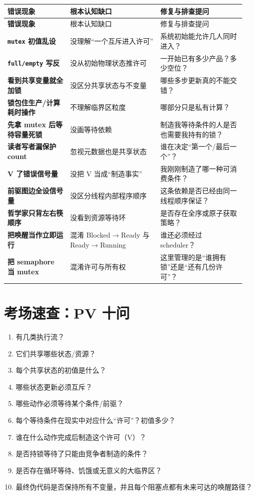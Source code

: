 \documentclass[11pt,a4paper]{ctexart}
\newcommand{\code}[1]{\texttt{#1}}
\begin{document}
\begingroup
\small
\renewcommand{\arraystretch}{1.25}
\begin{longtable}{>{\bfseries}p{0.25\linewidth} p{0.36\linewidth} p{0.34\linewidth}}
\toprule
错误现象 & 根本认知缺口 & 修复与排查提问\\
\midrule
\endfirsthead
\toprule
错误现象 & 根本认知缺口 & 修复与排查提问\\
\midrule
\endhead
\code{mutex} 初值乱设 & 没理解“一个互斥进入许可” & 系统初始能允许几人同时进入？\\
\code{full/empty} 写反 & 没从初始物理状态推许可 & 一开始已有多少产品？多少空位？\\
看到共享变量就全加锁 & 没区分共享状态与不变量 & 哪些多步更新真的不能交错？\\
锁包住生产/计算耗时操作 & 不理解临界区粒度 & 哪部分只是私有计算？\\
先拿 mutex 后等待容量死锁 & 没画等待依赖 & 制造我等待条件的人是否也需要我持有的锁？\\
读者写者漏保护 count & 忽视元数据也是共享状态 & 谁在决定“第一个/最后一个”？\\
V 了错误信号量 & 没把 V 当成“制造事实” & 我刚刚制造了哪一种可消费条件？\\
前驱图边全设信号量 & 没区分线程内部程序顺序 & 这条依赖是否已经由同一线程顺序保证？\\
哲学家只背左右筷顺序 & 没看到资源等待环 & 是否存在全序或原子获取策略？\\
把唤醒当作立即运行 & 混淆 Blocked$\to$Ready 与 Ready$\to$Running & 谁还必须经过 scheduler？\\
把 semaphore 当 mutex & 混淆许可与所有权 & 这里管理的是“谁拥有锁”还是“还有几份许可”？\\
\bottomrule
\end{longtable}
\endgroup

\section{考场速查：PV 十问}

\begin{exam}[拿到 PV 大题，按顺序问]
\begin{enumerate}
\item 有几类执行流？
\item 它们共享哪些状态/资源？
\item 每个共享状态的初值是什么？
\item 哪些状态更新必须互斥？
\item 哪些动作必须等待某个条件/前驱？
\item 每个等待条件在现实中对应什么“许可”？初值多少？
\item 谁在什么动作完成后制造这个许可（V）？
\item 是否持锁等待了只能由竞争者制造的条件？
\item 是否存在循环等待、饥饿或无意义的大临界区？
\item 最终伪代码是否保持所有不变量，并且每个阻塞点都有未来可达的唤醒路径？
\end{enumerate}
\end{exam}
\end{document}
